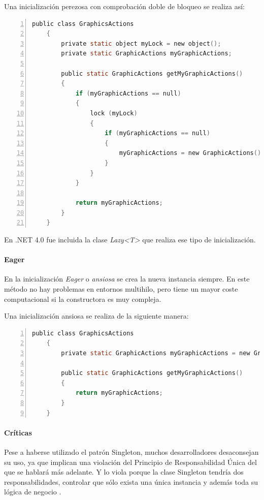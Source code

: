 Una inicializaci\'on perezosa con comprobaci\'on doble de bloqueo se realiza as\'i:
\begin{lstlisting}[language=C, numbers=left, showspaces=false, breaklines=true, tabsize=2]
    public class GraphicsActions 
    {
        private static object myLock = new object();
        private static GraphicActions myGraphicActions;
        
        public static GraphicActions getMyGraphicActions()
        {
            if (myGraphicActions == null)
            {
                lock (myLock)
                {
                    if (myGraphicActions == null)
                    {
                        myGraphicActions = new GraphicActions();
                    }
                }
            }
            
            return myGraphicActions;
        }
    }
\end{lstlisting}

En .NET 4.0 fue incluida la clase \emph{Lazy<T>} que realiza ese tipo de inicializaci\'on.

\paragraph{Eager} En la inicializaci\'on \emph{Eager} o \emph{ansiosa} se crea la nueva instancia siempre. En este m\'etodo no hay problemas
en entornos multihilo, pero tiene un mayor coste computacional si la constructora es muy compleja.

Una inicializaci\'on ansiosa se realiza de la siguiente manera:
\begin{lstlisting}[language=C, numbers=left, showspaces=false, breaklines=true, tabsize=2]
    public class GraphicsActions 
    {
        private static GraphicActions myGraphicActions = new GraphicActions();
        
        public static GraphicActions getMyGraphicActions()
        { 
            return myGraphicActions;
        }
    }
\end{lstlisting}

\paragraph{Cr\'iticas}Pese a haberse utilizado el patr\'on Singleton, muchos desarrolladores desaconsejan su uso, ya que implican
una violaci\'on del Principio de Responsabilidad \'Unica del que se hablar\'a m\'as adelante. Y lo viola porque
la clase Singleton tendr\'ia dos responsabilidades, controlar que s\'olo exista una \'unica instancia y adem\'as
toda su l\'ogica de negocio \cite{Singleton:EVIL}.

